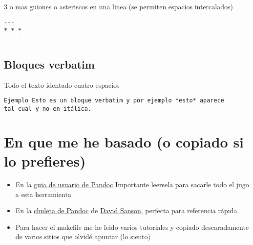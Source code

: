 \documentclass[12pt,es-ES,]{article}
\begin{document}
3 o mas guiones o asteriscos en una linea (se permiten espacios
intercalados)

\begin{verbatim}
---
* * *
- - - -
\end{verbatim}

\subsection{Bloques verbatim}\label{bloques-verbatim}

Todo el texto identado cuatro espacios

\begin{verbatim}
Ejemplo Esto es un bloque verbatim y por ejemplo *esto* aparece
tal cual y no en itálica.
\end{verbatim}

\section{En que me he basado (o copiado si lo
prefieres)}\label{en-que-me-he-basado-o-copiado-si-lo-prefieres}

\begin{itemize}
\itemsep1pt\parskip0pt
\item
  En la \href{http://pandoc.org/README.html}{guia de usuario de Pandoc}
  Importante leersela para sacarle todo el jugo a esta herramienta
\item
  En la
  \href{https://github.com/dsanson/Pandoc.tmbundle/blob/master/Support/doc/cheatsheet.markdown}{chuleta
  de Pandoc} de \href{https://github.com/dsanson}{David Sanson},
  perfecta para referencia rápida
\item
  Para hacer el makefile me he leido varios tutoriales y copiado
  descaradamente de varios sitios que olvidé apuntar (lo siento)
\end{itemize}
\end{document}

